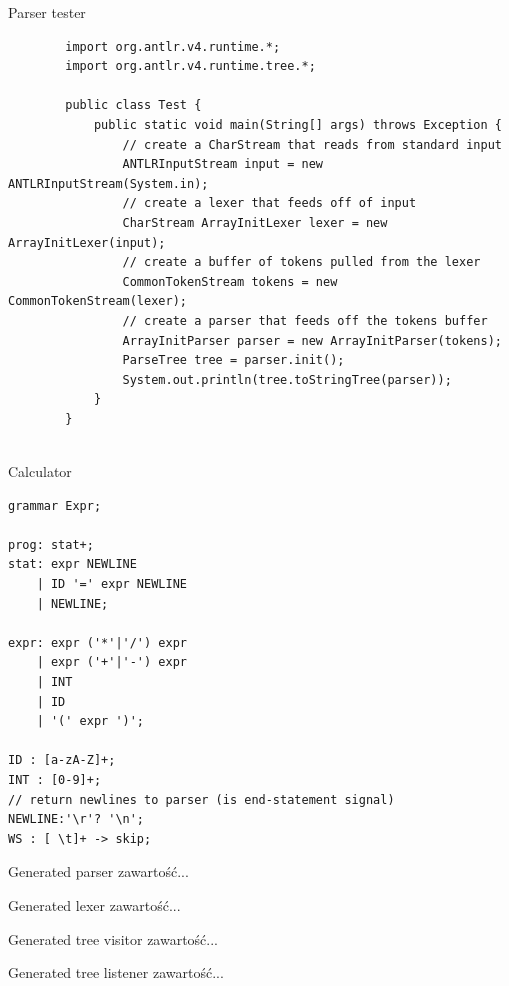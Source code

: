 \documentclass{beamer}
\begin{document}
\begin{frame}[fragile]{Parser tester}
	\footnotesize\begin{verbatim}
		import org.antlr.v4.runtime.*;
		import org.antlr.v4.runtime.tree.*;
		
		public class Test { 
		    public static void main(String[] args) throws Exception { 
		        // create a CharStream that reads from standard input 
		        ANTLRInputStream input = new ANTLRInputStream(System.in);
		        // create a lexer that feeds off of input 
		        CharStream ArrayInitLexer lexer = new ArrayInitLexer(input);
		        // create a buffer of tokens pulled from the lexer 
		        CommonTokenStream tokens = new CommonTokenStream(lexer);
		        // create a parser that feeds off the tokens buffer 
		        ArrayInitParser parser = new ArrayInitParser(tokens);
		        ParseTree tree = parser.init();
		        System.out.println(tree.toStringTree(parser));
		    } 
		}
		
	\end{verbatim}
\end{frame}

\begin{frame}[fragile]{Calculator}
\footnotesize\begin{lstlisting}
grammar Expr;

prog: stat+;
stat: expr NEWLINE
    | ID '=' expr NEWLINE
    | NEWLINE;

expr: expr ('*'|'/') expr
    | expr ('+'|'-') expr
    | INT
    | ID
    | '(' expr ')';

ID : [a-zA-Z]+;
INT : [0-9]+;
// return newlines to parser (is end-statement signal)
NEWLINE:'\r'? '\n';
WS : [ \t]+ -> skip;
\end{lstlisting}
\end{frame}

\begin{frame}{Generated parser}
	zawartość...
\end{frame}

\begin{frame}{Generated lexer}
	zawartość...
\end{frame}

\begin{frame}{Generated tree visitor}
	zawartość...
\end{frame}

\begin{frame}{Generated tree listener}
	zawartość...
\end{frame}
\end{document}
